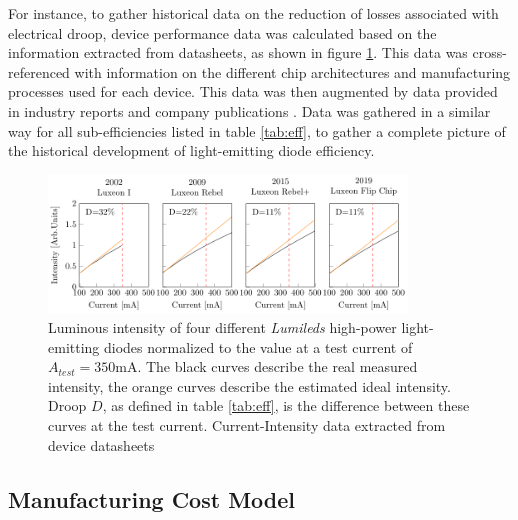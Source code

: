 \documentclass[a4paper,nocompress]{spie}  %
\begin{document}
        For instance, to gather historical data on the reduction of losses associated with electrical droop, device performance data was calculated based on the information extracted from datasheets, as shown in figure \ref{fig:droop}. This data was cross-referenced with information on the different chip architectures and manufacturing processes used for each device. This data was then augmented by data provided in industry reports and company publications \cite{osram2014osram}. Data was gathered in a similar way for all sub-efficiencies listed in table \ref{tab:eff}, to gather a complete picture of the historical development of light-emitting diode efficiency.

        \begin{figure} [ht]
            \begin{center}
                \includegraphics[width=0.85\textwidth]{SPIE/article/droop_lumileds.pdf}
            \end{center}
            \caption{Luminous intensity of four different \textit{Lumileds} high-power light-emitting diodes normalized to the value at a test current of $A_{test}=350$mA. The black curves describe the real measured intensity, the orange curves describe the estimated ideal intensity. Droop $D$, as defined in table \ref{tab:eff}, is the difference between these curves at the test current. Current-Intensity data extracted from device datasheets \cite{datasheet_lumileds_lux1,datasheet_lumileds_rebel,datasheet_lumileds_rebplus,lumi2019data}}
            \label{fig:droop}
        \end{figure}



    \subsection{Manufacturing Cost Model}
\end{document}
